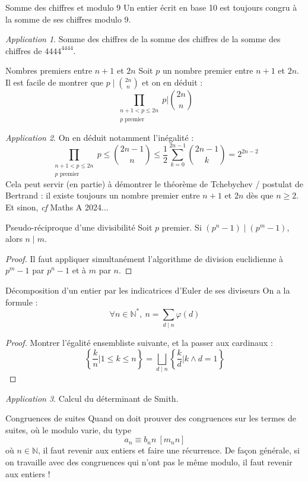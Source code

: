 \documentclass[french]{book}
\newcommand{\N}{\mathbb{N}}
\newcommand{\st}{^*}
\theoremstyle{plain}
\theoremstyle{definition}
\theoremstyle{remark}
\newtheorem*{app}{Application}
\begin{document}
\begin{AS}{Somme des chiffres et modulo 9}
	Un entier écrit en base 10 est toujours congru à la somme de ses chiffres modulo 9.
\end{AS}

\begin{app}
	Somme des chiffres de la somme des chiffres de la somme des chiffres de $4444^{4444}$.
\end{app}

\begin{AS}{Nombres premiers entre $n+1$ et $2n$} Soit $p$ un nombre premier entre $n+1$ et $2n$. Il est facile de montrer que $p\mid\binom{2n}{n}$ et on en déduit : $$\prod_{\substack{n+1< p\leqslant 2n \\ p\text{ premier}}}p \bigg| \binom{2n}{n}$$
\end{AS}
\begin{app}
	On en déduit notamment l'inégalité : $$\prod_{\substack{n+1< p\leqslant 2n \\ p\text{ premier}}}p\leqslant\binom{2n-1}{n}\leqslant\frac{1}{2}\sum_{k=0}^{2n-1}\binom{2n-1}{k}= 2^{2n-2}$$ Cela peut servir (en partie) à démontrer le théorème de Tchebychev / postulat de Bertrand : il existe toujours un nombre premier entre $n+1$ et $2n$ dès que $n\geqslant2$. Et sinon, \textit{cf} Maths A 2024...
\end{app}
\begin{AS}{Pseudo-réciproque d'une divisibilité} Soit $p$ premier. Si $(p^n-1)\mid(p^m-1)$, alors $n\mid m$.
\end{AS}
\begin{proof}
	Il faut appliquer simultanément l'algorithme de division euclidienne à $p^m-1$ par $p^n-1$ et à $m$ par $n$.
\end{proof}
\begin{AS}{Décomposition d'un entier par les indicatrices d'Euler de ses diviseurs} On a la formule : $$\forall n\in\N\st,\ n=\sum_{d\mid n}\varphi(d)$$
\end{AS}
\begin{proof}
	 Montrer l'égalité ensembliste suivante, et la passer aux cardinaux : $$\left\{\frac{k}{n}|1\leqslant k\leqslant n\right\}=\bigsqcup_{d\mid n}\left\{\frac{k}{d}|k\wedge d=1\right\}$$
\end{proof}
\begin{app}
	Calcul du déterminant de Smith.
\end{app}
\begin{AS}{Congruences de suites} Quand on doit prouver des congruences sur les termes de suites, où le modulo varie, du type $$a_n\equiv b_nn\ [m_nn]$$ où $n\in\N$, il faut revenir aux entiers et faire une récurrence. De façon générale, si on travaille avec des congruences qui n’ont pas le même modulo, il faut revenir aux entiers !
\end{AS}
\end{document}
